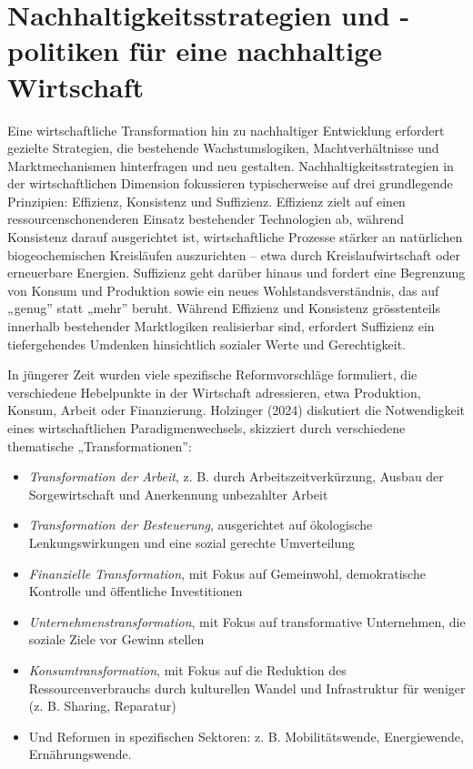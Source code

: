 \documentclass[
  nswissgerman,
  a4paper,
  openany]{book}
\begin{document}
\section{Nachhaltigkeitsstrategien und -politiken für eine nachhaltige
Wirtschaft}\label{nachhaltigkeitsstrategien-und--politiken-fuxfcr-eine-nachhaltige-wirtschaft}

Eine wirtschaftliche Transformation hin zu nachhaltiger Entwicklung
erfordert gezielte Strategien, die bestehende Wachstumslogiken,
Machtverhältnisse und Marktmechanismen hinterfragen und neu gestalten.
Nachhaltigkeitsstrategien in der wirtschaftlichen Dimension fokussieren
typischerweise auf drei grundlegende Prinzipien: Effizienz, Konsistenz
und Suffizienz. Effizienz zielt auf einen ressourcenschonenderen Einsatz
bestehender Technologien ab, während Konsistenz darauf ausgerichtet ist,
wirtschaftliche Prozesse stärker an natürlichen biogeochemischen
Kreisläufen auszurichten -- etwa durch Kreislaufwirtschaft oder
erneuerbare Energien. Suffizienz geht darüber hinaus und fordert eine
Begrenzung von Konsum und Produktion sowie ein neues
Wohlstandsverständnis, das auf „genug'' statt „mehr'' beruht. Während
Effizienz und Konsistenz grösstenteils innerhalb bestehender
Marktlogiken realisierbar sind, erfordert Suffizienz ein tiefergehendes
Umdenken hinsichtlich sozialer Werte und Gerechtigkeit.

In jüngerer Zeit wurden viele spezifische Reformvorschläge formuliert,
die verschiedene Hebelpunkte in der Wirtschaft adressieren, etwa
Produktion, Konsum, Arbeit oder Finanzierung. Holzinger (2024)
diskutiert die Notwendigkeit eines wirtschaftlichen Paradigmenwechsels,
skizziert durch verschiedene thematische „Transformationen'':

\begin{itemize}
\item
  \emph{Transformation der Arbeit}, z. B. durch Arbeitszeitverkürzung,
  Ausbau der Sorgewirtschaft und Anerkennung unbezahlter Arbeit
\item
  \emph{Transformation der Besteuerung}, ausgerichtet auf ökologische
  Lenkungswirkungen und eine sozial gerechte Umverteilung
\item
  \emph{Finanzielle Transformation}, mit Fokus auf Gemeinwohl,
  demokratische Kontrolle und öffentliche Investitionen
\item
  \emph{Unternehmenstransformation}, mit Fokus auf transformative
  Unternehmen, die soziale Ziele vor Gewinn stellen
\item
  \emph{Konsumtransformation}, mit Fokus auf die Reduktion des
  Ressourcenverbrauchs durch kulturellen Wandel und Infrastruktur für
  weniger (z. B. Sharing, Reparatur)
\item
  Und Reformen in spezifischen Sektoren: z. B. Mobilitätswende,
  Energiewende, Ernährungswende.
\end{itemize}
\end{document}
